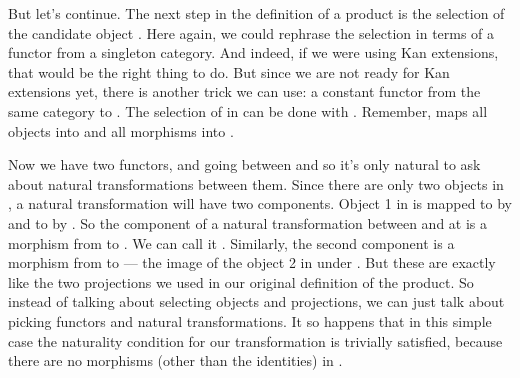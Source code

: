 But let's continue. The next step in the definition of a product is the
selection of the candidate object . Here again, we could
rephrase the selection in terms of a functor from a singleton category.
And indeed, if we were using Kan extensions, that would be the right
thing to do. But since we are not ready for Kan extensions yet, there is
another trick we can use: a constant functor \mathtext{\Delta} from the same category
 to . The selection of  in  can be
done with . Remember,  maps all
objects into  and all morphisms into .

\begin{figure}[H]
    \centering
\end{figure}

Now we have two functors,  and  going between
 and  so it's only natural to ask about natural
transformations between them. Since there are only two objects in
, a natural transformation will have two components. Object 1
in  is mapped to  by  and to
 by . So the component of a natural transformation between
 and  at  is a morphism from  to
. We can call it . Similarly, the second component
is a morphism  from  to  --- the image of
the object 2 in  under . But these are exactly like the two
projections we used in our original definition of the product. So
instead of talking about selecting objects and projections, we can just
talk about picking functors and natural transformations. It so happens
that in this simple case the naturality condition for our transformation
is trivially satisfied, because there are no morphisms (other than the
identities) in .

\begin{figure}[H]
    \centering
\end{figure}

